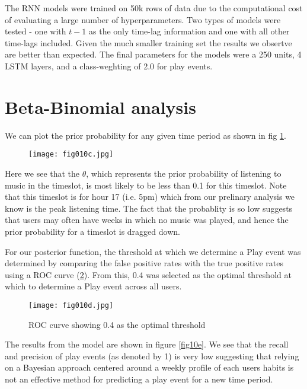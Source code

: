 The RNN models were trained on 50k rows of data due to the computational cost of evaluating a large number of hyperparameters. Two types of models were tested - one with $t-1$ as the only time-lag information and one with all other time-lags included. Given the much smaller training set the results we obsertve are better than expected.  The final parameters for the models were a 250 units, 4 LSTM layers, and a class-weghting of 2.0 for play events.

\section{Beta-Binomial analysis}

We can plot the prior probability for any given time period as shown in fig \ref{fig10c}.

\begin{figure}[h!]
	\centering
	\texttt{[image: fig010c.jpg]}
	\caption{}
	\label{fig10c}
\end{figure} 

Here we see that the $\theta$, which represents the prior probability of listening to music in the timeslot, is most likely to be less than 0.1 for this timeslot. Note that this timeslot is for hour 17 (i.e. 5pm) which from our prelinary analysis we  know is the peak listening time. The fact that the probablity is so low suggests that users may often have weeks in which no music was played, and hence the prior probability for a timeslot is dragged down. 

For our posterior function, the threshold at which we determine a Play event was determined by comparing the false positive rates with the true positive rates using a ROC curve (\ref{fig10d}). From this, 0.4 was selected as the optimal threshold at which to determine a Play event across all users.

\begin{figure}[h!]
	\centering
	\texttt{[image: fig010d.jpg]}
	\caption{ROC curve showing 0.4 as the optimal threshold}
	\label{fig10d}
\end{figure} 

The results from the model are shown in figure \ref{fig10e}. We see that the recall and precision of play events (as denoted by 1) is very low suggesting that relying on a Bayesian approach centered around a weekly profile of each users habits is not an effective method for predicting a play event for a new time period.

